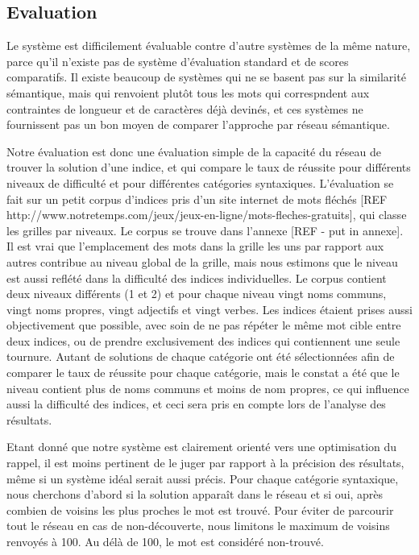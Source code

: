 \documentclass[a4paper, 12pt]{article}
\begin{document}
\subsection{Evaluation}
Le système est difficilement évaluable contre d'autre systèmes de la même 
nature, parce qu'il n'existe pas de système d'évaluation standard et de scores 
comparatifs. Il existe beaucoup de systèmes qui ne se basent pas sur la 
similarité sémantique, mais qui renvoient plutôt tous les mots qui correspndent 
aux contraintes de longueur et de caractères déjà devinés, et ces systèmes ne 
fournissent pas un bon moyen de comparer l'approche par réseau sémantique.

Notre évaluation est donc une évaluation simple de la capacité du réseau de 
trouver la solution d'une indice, et qui compare le taux de réussite pour 
différents niveaux de difficulté et pour différentes catégories syntaxiques. 
L'évaluation se fait sur un petit corpus d'indices pris d'un site internet de 
mots fléchés [REF 
http://www.notretemps.com/jeux/jeux-en-ligne/mots-fleches-gratuits], qui classe 
les grilles par niveaux. Le corpus se trouve dans l'annexe [REF - put in 
annexe]. Il est vrai que l'emplacement des mots dans la grille les uns par 
rapport aux autres contribue au niveau global de la grille, mais nous estimons 
que le niveau est aussi reflété dans la difficulté des indices individuelles. Le 
corpus contient deux niveaux différents (1 et 2) et pour chaque niveau vingt 
noms communs, vingt noms propres, vingt adjectifs et vingt verbes. Les indices 
étaient prises aussi objectivement que possible, avec soin de ne pas répéter le 
même mot cible entre deux indices, ou de prendre exclusivement des indices qui 
contiennent une seule tournure. Autant de solutions de chaque catégorie ont été 
sélectionnées afin de comparer le taux de réussite pour chaque catégorie, mais 
le constat a été que le niveau contient plus de noms communs et moins de nom 
propres, ce qui influence aussi la difficulté des indices, et ceci sera pris en 
compte lors de l'analyse des résultats.

Etant donné que notre système est clairement orienté vers une optimisation du 
rappel, il est moins pertinent de le juger par rapport à la précision des 
résultats, même si un système idéal serait aussi précis. Pour chaque catégorie 
syntaxique, nous cherchons d'abord si la solution apparaît dans le réseau et si 
oui, après combien de voisins les plus proches le mot est trouvé. Pour éviter de 
parcourir tout le réseau en cas de non-découverte, nous limitons le maximum de 
voisins renvoyés à 100. Au délà de 100, le mot est considéré non-trouvé.
\end{document}
